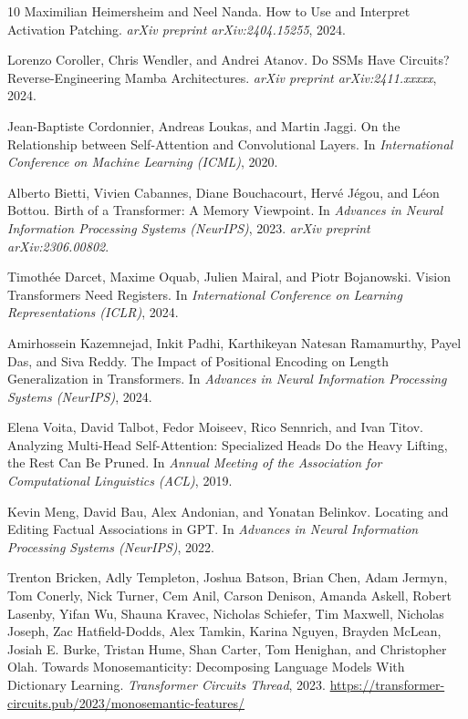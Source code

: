 \documentclass[11pt]{article}
\theoremstyle{definition}
\begin{document}
\begin{thebibliography}{10}
Maximilian Heimersheim and Neel Nanda.
\newblock How to Use and Interpret Activation Patching.
\newblock \emph{arXiv preprint arXiv:2404.15255}, 2024.

Lorenzo Coroller, Chris Wendler, and Andrei Atanov.
\newblock Do SSMs Have Circuits? Reverse-Engineering Mamba Architectures.
\newblock \emph{arXiv preprint arXiv:2411.xxxxx}, 2024.

Jean-Baptiste Cordonnier, Andreas Loukas, and Martin Jaggi.
\newblock On the Relationship between Self-Attention and Convolutional Layers.
\newblock In \emph{International Conference on Machine Learning (ICML)}, 2020.

Alberto Bietti, Vivien Cabannes, Diane Bouchacourt, Herv\'e J\'egou, and L\'eon Bottou.
\newblock Birth of a Transformer: A Memory Viewpoint.
\newblock In \emph{Advances in Neural Information Processing Systems (NeurIPS)}, 2023.
\newblock \emph{arXiv preprint arXiv:2306.00802}.

Timoth\'ee Darcet, Maxime Oquab, Julien Mairal, and Piotr Bojanowski.
\newblock Vision Transformers Need Registers.
\newblock In \emph{International Conference on Learning Representations (ICLR)}, 2024.

Amirhossein Kazemnejad, Inkit Padhi, Karthikeyan Natesan Ramamurthy, Payel Das, and Siva Reddy.
\newblock The Impact of Positional Encoding on Length Generalization in Transformers.
\newblock In \emph{Advances in Neural Information Processing Systems (NeurIPS)}, 2024.

Elena Voita, David Talbot, Fedor Moiseev, Rico Sennrich, and Ivan Titov.
\newblock Analyzing Multi-Head Self-Attention: Specialized Heads Do the Heavy Lifting, the Rest Can Be Pruned.
\newblock In \emph{Annual Meeting of the Association for Computational Linguistics (ACL)}, 2019.

Kevin Meng, David Bau, Alex Andonian, and Yonatan Belinkov.
\newblock Locating and Editing Factual Associations in GPT.
\newblock In \emph{Advances in Neural Information Processing Systems (NeurIPS)}, 2022.

Trenton Bricken, Adly Templeton, Joshua Batson, Brian Chen, Adam Jermyn, Tom Conerly, Nick Turner, Cem Anil, Carson Denison, Amanda Askell, Robert Lasenby, Yifan Wu, Shauna Kravec, Nicholas Schiefer, Tim Maxwell, Nicholas Joseph, Zac Hatfield-Dodds, Alex Tamkin, Karina Nguyen, Brayden McLean, Josiah E. Burke, Tristan Hume, Shan Carter, Tom Henighan, and Christopher Olah.
\newblock Towards Monosemanticity: Decomposing Language Models With Dictionary Learning.
\newblock \emph{Transformer Circuits Thread}, 2023.
\newblock \url{https://transformer-circuits.pub/2023/monosemantic-features/}


\end{thebibliography}
\end{document}
